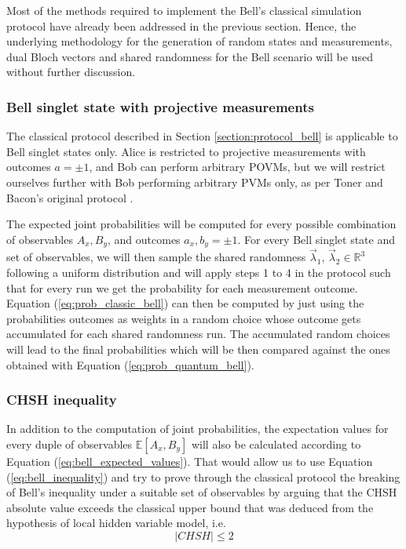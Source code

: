 Most of the methods required to implement the Bell's classical simulation protocol have already been addressed in the previous section. Hence, the underlying methodology for the generation of random states and measurements, dual Bloch vectors and shared randomness for the Bell scenario will be used without further discussion.

\subsubsection{Bell singlet state with projective measurements}

The classical protocol described in Section \ref{section:protocol_bell} is applicable to Bell singlet states only. Alice is restricted to projective measurements with outcomes $a=\pm1$, and Bob can perform arbitrary POVMs, but we will restrict ourselves further with Bob performing arbitrary PVMs only, as per Toner and Bacon's original protocol \cite{toner2003}.

The expected joint probabilities will be computed for every possible combination of observables $A_{x}, B_{y}$, and outcomes $a_{x}, b_{y} = \pm1$. For every Bell singlet state and set of observables, we will then sample the shared randomness $\vec{\lambda}_1$, $\vec{\lambda}_2 \in \mathbb{R}^3$ following a uniform distribution and will apply steps 1 to 4 in the protocol such that for every run we get the probability for each measurement outcome. Equation (\ref{eq:prob_classic_bell}) can then be computed by just using the probabilities outcomes as weights in a random choice whose outcome gets accumulated for each shared randomness run. The accumulated random choices will lead to the final probabilities which will be then compared against the ones obtained with Equation (\ref{eq:prob_quantum_bell}).

\subsubsection{CHSH inequality}
In addition to the computation of joint probabilities, the expectation values for every duple of observables $\mathbb{E}[A_{x}, B_{y}]$ will also be calculated according to Equation (\ref{eq:bell_expected_values}). That would allow us to use Equation (\ref{eq:bell_inequality}) and try to prove through the classical protocol the breaking of Bell's inequality under a suitable set of observables by arguing that the CHSH absolute value exceeds the classical upper bound that was deduced from the hypothesis of local hidden variable model, i.e.
\begin{equation}\label{eq:chsh_inequality}
|\mathit{CHSH}| \leq 2
\end{equation}